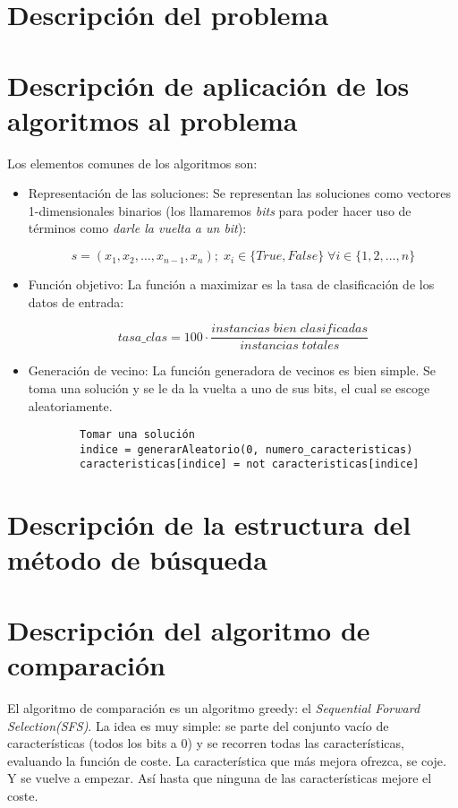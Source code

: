 \documentclass[a4paper, 11pt]{article}
\begin{document}
  \maketitle
  \tableofcontents
  \newpage

  \section{Descripción del problema}

    

  \section{Descripción de aplicación de los algoritmos al problema}
    Los elementos comunes de los algoritmos son:
    \begin{itemize}
      \item Representación de las soluciones: Se representan las soluciones como vectores 1-dimensionales binarios (los llamaremos \emph{bits} para poder hacer uso de términos como \emph{darle la vuelta a un bit}):

      $$ s = (x_1,x_2,\ldots,x_{n-1},x_n) ; \; x_i \in \{True,False\} \; \forall i \in \{1,2,\ldots,n\} $$
      \item Función objetivo: La función a maximizar es la tasa de clasificación de los datos de entrada:

      $$ tasa\_clas = 100 \cdot \frac{instancias\;bien\;clasificadas}{instancias\;totales} $$

      \item Generación de vecino: La función generadora de vecinos es bien simple. Se toma una solución y se le da la vuelta a uno de sus bits, el cual se escoge aleatoriamente.
      \begin{verbatim}
        Tomar una solución
        indice = generarAleatorio(0, numero_caracteristicas)
        caracteristicas[indice] = not caracteristicas[indice]
      \end{verbatim}
    \end{itemize}
  \section{Descripción de la estructura del método de búsqueda}

  \section{Descripción del algoritmo de comparación}
    El algoritmo de comparación es un algoritmo greedy: el \emph{Sequential Forward Selection(SFS)}. La idea es muy simple: se parte del conjunto vacío de características (todos los bits a 0) y se recorren todas las características, evaluando la función de coste. La característica que más mejora ofrezca, se coje. Y se vuelve a empezar. Así hasta que ninguna de las características mejore el coste.
\end{document}

